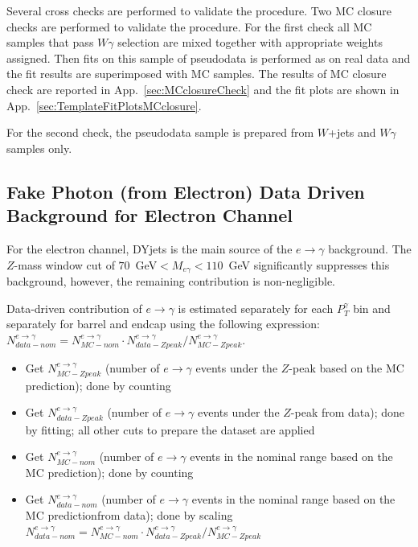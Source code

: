 Several cross checks are performed to validate the procedure. Two MC closure checks are performed to validate the procedure. For the first check all MC samples that pass $W\gamma$ selection are mixed together with appropriate weights assigned. Then fits on this sample of pseudodata is performed as on real data and the fit results are superimposed with MC samples. The results of MC closure check are reported in App.~\ref{sec:MCclosureCheck} and the fit plots are shown in App.~\ref{sec:TemplateFitPlotsMCclosure}. 

For the second check, the pseudodata sample is prepared from $W$+jets and $W\gamma$ samples only. 

\subsection{Fake Photon (from Electron) Data Driven Background for Electron Channel}
\label{sec:BackgroundSubtraction_etog}

For the electron channel, DYjets is the main source of the $e \rightarrow \gamma$ background. The $Z$-mass window cut of $70$~GeV$<M_{e\gamma}<110$~GeV significantly suppresses this background, however, the remaining contribution is non-negligible. 

Data-driven contribution of $e\rightarrow\gamma$ is estimated separately for each $P_{T}^{\gamma}$ bin and separately for barrel and endcap using the following expression: $N_{data-nom}^{e\rightarrow\gamma} = N_{MC-nom}^{e\rightarrow\gamma} \cdot N_{data-Zpeak}^{e\rightarrow\gamma}/N_{MC-Zpeak}^{e\rightarrow\gamma}$. 

\begin{itemize}
  \item Get $N_{MC-Zpeak}^{e\rightarrow\gamma}$ (number of $e\rightarrow\gamma$ events under the $Z$-peak based on the MC prediction); done by counting
  \item Get $N_{data-Zpeak}^{e\rightarrow\gamma}$ (number of $e\rightarrow\gamma$ events under the $Z$-peak from data); done by fitting; all other cuts to prepare the dataset are applied
  \item Get $N_{MC-nom}^{e\rightarrow\gamma}$ (number of $e\rightarrow\gamma$ events in the nominal range based on the MC prediction); done by counting
  \item Get $N_{data-nom}^{e\rightarrow\gamma}$ (number of $e\rightarrow\gamma$ events in the nominal range based on the MC predictionfrom data); done by scaling $N_{data-nom}^{e\rightarrow\gamma} = N_{MC-nom}^{e\rightarrow\gamma} \cdot N_{data-Zpeak}^{e\rightarrow\gamma}/N_{MC-Zpeak}^{e\rightarrow\gamma}$
\end{itemize}

